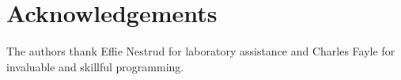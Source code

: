 \section{Acknowledgements}
The authors thank Effie Nestrud for laboratory assistance and Charles Fayle for invaluable and skillful programming. 

\pagebreak
\renewcommand\bibname{{REFERENCES}} %
{} %

